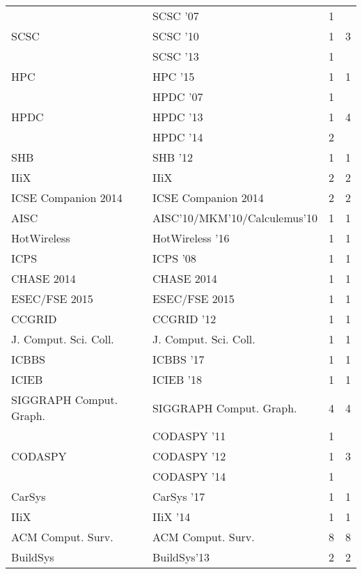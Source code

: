 \begin{table*}[t]
\begin{tabular}{llrr}
\multirow{3}{*}{SCSC } & SCSC '07 & 1 & \multirow{3}{*}{3}\\
& SCSC '10 & 1 &\\
& SCSC '13 & 1 &\\
\multirow{1}{*}{HPC } & HPC '15 & 1 & \multirow{1}{*}{1}\\
\multirow{3}{*}{HPDC } & HPDC '07 & 1 & \multirow{3}{*}{4}\\
& HPDC '13 & 1 &\\
& HPDC '14 & 2 &\\
\multirow{1}{*}{SHB } & SHB '12 & 1 & \multirow{1}{*}{1}\\
\multirow{1}{*}{IIiX} & IIiX & 2 & \multirow{1}{*}{2}\\
\multirow{1}{*}{ICSE Companion 2014} & ICSE Companion 2014 & 2 & \multirow{1}{*}{2}\\
\multirow{1}{*}{AISC} & AISC'10/MKM'10/Calculemus'10 & 1 & \multirow{1}{*}{1}\\
\multirow{1}{*}{HotWireless } & HotWireless '16 & 1 & \multirow{1}{*}{1}\\
\multirow{1}{*}{ICPS } & ICPS '08 & 1 & \multirow{1}{*}{1}\\
\multirow{1}{*}{CHASE 2014} & CHASE 2014 & 1 & \multirow{1}{*}{1}\\
\multirow{1}{*}{ESEC/FSE 2015} & ESEC/FSE 2015 & 1 & \multirow{1}{*}{1}\\
\multirow{1}{*}{CCGRID } & CCGRID '12 & 1 & \multirow{1}{*}{1}\\
\multirow{1}{*}{J. Comput. Sci. Coll.} & J. Comput. Sci. Coll. & 1 & \multirow{1}{*}{1}\\
\multirow{1}{*}{ICBBS } & ICBBS '17 & 1 & \multirow{1}{*}{1}\\
\multirow{1}{*}{ICIEB } & ICIEB '18 & 1 & \multirow{1}{*}{1}\\
\multirow{1}{*}{SIGGRAPH Comput. Graph.} & SIGGRAPH Comput. Graph. & 4 & \multirow{1}{*}{4}\\
\multirow{3}{*}{CODASPY } & CODASPY '11 & 1 & \multirow{3}{*}{3}\\
& CODASPY '12 & 1 &\\
& CODASPY '14 & 1 &\\
\multirow{1}{*}{CarSys } & CarSys '17 & 1 & \multirow{1}{*}{1}\\
\multirow{1}{*}{IIiX } & IIiX '14 & 1 & \multirow{1}{*}{1}\\
\multirow{1}{*}{ACM Comput. Surv.} & ACM Comput. Surv. & 8 & \multirow{1}{*}{8}\\
\multirow{1}{*}{BuildSys} & BuildSys'13 & 2 & \multirow{1}{*}{2}\\

\end{tabular}
\end{table*}
